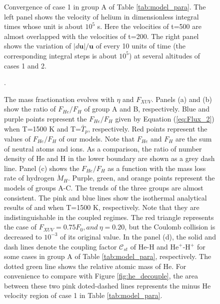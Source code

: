 \documentclass[journal, onecolumn]{aastex631}
\begin{document}
\begin{CJK*}{UTF8}{gbsn}
\begin{figure}[ht!]
\caption{Convergence of case 1 in group A of Table \ref{tab:model_para}. The left panel shows the velocity of helium in dimensionless integral times whose unit is about $10^5$ s. Here the velocities of t=500 are almost overlapped with the velocities of t=200. The right panel shows the variation of $|d\textbf{u}|/\textbf{u}$ of every 10 units of time (the corresponding integral steps is about $10^5$) at several altitudes of cases 1 and 2.}
\label{fig:cvg_ncp}
\end{figure}

\begin{figure}[ht!]
\caption{The mass fractionation evolves with $\eta$ and $F_{XUV}$. Panels (a) and (b) show the ratio of $F_{He}/F_{H}$ of group A and B, respectively. Blue and purple points represent the $F_{He}/F_{H}$ given by Equation (\ref{eq:Flux_2}) when T=1500 K and T=$\bar{T}_p$, respectively. Red points represent the values of $F_{He}/F_{H}$ of our models. Note that $F_{He}$ and $F_{H}$ are the sum of neutral atoms and ions. As a comparison, the ratio of number density of He and H in the lower boundary are shown as a grey dash line.  Panel (c) shows the $F_{He}/F_{H}$ as a function with the mass loss rate of hydrogen $\dot{M}_{H}$. Purple, green, and orange points represent the models of groups A-C. The trends of the three groups are almost consistent. The pink and blue lines show the isothermal analytical results of \cite{Zahnle1986} and \cite{Hunten1987} when T=1500 K, respectively. Note that they are indistinguishable in the coupled regimes. The red triangle represents the case of $F_{XUV} = 0.75F_{0}, and \ \eta = 0.20$, but the Coulomb collision is decreased to $10^{-3}$ of its original value. In the panel (d), the solid and dash lines denote the coupling factor $\mathscr{C}_{st}$ of He-H and He$^+$-H$^+$  for some cases in group A of Table \ref{tab:model_para}, respectively. The dotted green line shows the relative atomic mass of He. For convenience to compare with Figure \ref{fig:he_decouple}, the area between these two pink doted-dashed lines represents the minus He velocity region of case 1 in Table \ref{tab:model_para}.
}\label{fig:mf_aly}.
\end{figure}



\end{CJK*}
\end{document}
